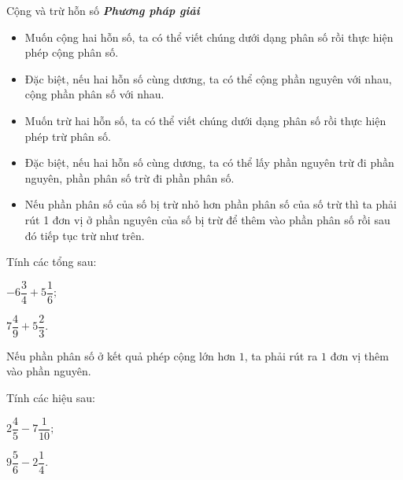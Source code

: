 \setcounter{vd}{0}
\begin{dang}{Cộng và trừ hỗn số}
\textbf{\textit{Phương pháp giải}}
\begin{itemize}
\item Muốn cộng hai hỗn số, ta có thể viết chúng dưới dạng phân số rồi thực hiện phép cộng phân số.
\item Đặc biệt, nếu hai hỗn số cùng dương, ta có thể cộng phần nguyên với nhau, cộng phần phân số với nhau.
\item Muốn trừ hai hỗn số, ta có thể viết chúng dưới dạng phân số rồi thực hiện phép trừ phân số.
\item Đặc biệt, nếu hai hỗn số cùng dương, ta có thể lấy phần nguyên trừ đi phần nguyên, phần phân số trừ đi phần phân số.
\item Nếu phần phân số của số bị trừ nhỏ hơn phần phân số của số trừ thì ta phải rút 1 đơn vị ở phần nguyên của số bị trừ để thêm vào phần phân số rồi sau đó tiếp tục trừ như trên.
\end{itemize}
\end{dang}
\begin{vd} %
Tính các tổng sau:
\begin{listEX}[2]
\item $-6\dfrac{3}{4} + 5\dfrac{1}{6};$
\item $7\dfrac{4}{9} + 5\dfrac{2}{3}.$
\end{listEX} 
\begin{note}
Nếu phần phân số ở kết quả phép cộng lớn hơn $1$, ta phải rút ra $1$ đơn vị thêm vào phần nguyên.
\end{note}
\end{vd}
\begin{vd} %
Tính các hiệu sau:
\begin{listEX}[2]
\item $2\dfrac{4}{5} - 7\dfrac{1}{10};$
\item $9\dfrac{5}{6} - 2\dfrac{1}{4}.$
\end{listEX} 
\end{vd}
